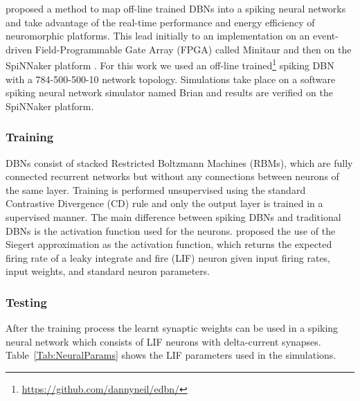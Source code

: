 \citet{10.3389/fnins.2013.00178} proposed a method to map off-line trained DBNs into a spiking neural networks and take advantage of the real-time performance and energy efficiency of neuromorphic platforms. This lead initially to an implementation on an event-driven Field-Programmable Gate Array (FPGA) called Minitaur \citep{dannminitaur} and then on the SpiNNaker platform \citep{iscasSpinnakerAcceptedDemo,SpinnakerDBN2015}. For this work we used an off-line trained\footnote{\url{https://github.com/dannyneil/edbn/}} spiking DBN with a 784-500-500-10 network topology. Simulations take place on a software spiking neural network simulator named Brian \citep{briansim} and results are verified on the SpiNNaker platform.

\subsubsection{Training}

DBNs consist of stacked Restricted Boltzmann Machines (RBMs), which are fully connected recurrent networks but without any connections between neurons of the same layer. Training is performed unsupervised using the standard Contrastive Divergence (CD) rule \citep{Hinton_Contr_Divergence2006} and only the output layer is trained in a supervised manner. The main difference between spiking DBNs and traditional DBNs is the activation function used for the neurons. \citet{10.3389/fnins.2013.00178} proposed the use of the Siegert approximation \citep{Jug_etal_2012} as the activation function, which returns the expected firing rate of a leaky integrate and fire (LIF) neuron given input firing rates, input weights, and standard neuron parameters.

\subsubsection{Testing}
After the training process the learnt synaptic weights can be used in a spiking neural network which consists of LIF neurons with delta-current synapses. Table~\ref{Tab:NeuralParams} shows the LIF parameters used in the simulations.

